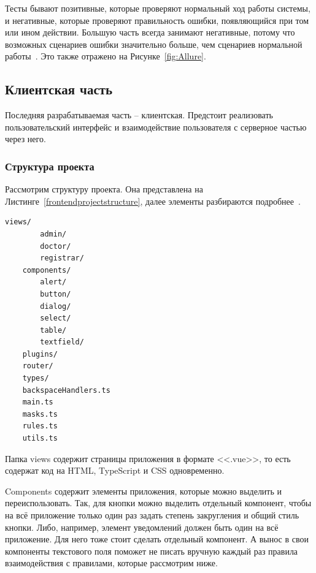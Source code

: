 \documentclass[a4paper,article]{article}
\begin{document}
\begin{sloppypar}
    Тесты бывают позитивные, которые проверяют нормальный ход работы системы, и негативные, которые проверяют правильность ошибки, появляющийся при том или ином действии. Большую часть всегда занимают негативные, потому что возможных сценариев ошибки значительно больше, чем сценариев нормальной работы~\cite{baeldungbook}. Это также отражено на Рисунке~\ref{fig:Allure}.

    \newpage

    \subsection{Клиентская часть}\label{Реализация. Клиентская часть}

    Последняя разрабатываемая часть -- клиентская. Предстоит реализовать пользовательский интерфейс и взаимодействие пользователя с серверное частью через него.

    \subsubsection{Структура проекта}\label{Реализация. Клиентская часть. Структура проекта}

    Рассмотрим структуру проекта. Она представлена на Листинге~\ref{frontendprojectstructure}, далее элементы разбираются подробнее~\cite{vuejs}.

    \begin{lstlisting}[label=frontendprojectstructure,caption=Структура клиентского приложения]
    views/
        admin/
        doctor/
        registrar/
    components/
        alert/
        button/
        dialog/
        select/
        table/
        textfield/
    plugins/
    router/
    types/
    backspaceHandlers.ts
    main.ts
    masks.ts
    rules.ts
    utils.ts
    \end{lstlisting}

    Папка views содержит страницы приложения в формате <<.vue>>, то есть содержат код на HTML, TypeScript и CSS одновременно.

    Components содержит элементы приложения, которые можно выделить и переиспользовать. Так, для кнопки можно выделить отдельный компонент, чтобы на всё приложение только один раз задать степень закругления и общий стиль кнопки. Либо, например, элемент уведомлений должен быть один на всё приложение. Для него тоже стоит сделать отдельный компонент. А вынос в свои компоненты текстового поля поможет не писать вручную каждый раз правила взаимодействия с правилами, которые рассмотрим ниже.


\end{sloppypar}
\end{document}
